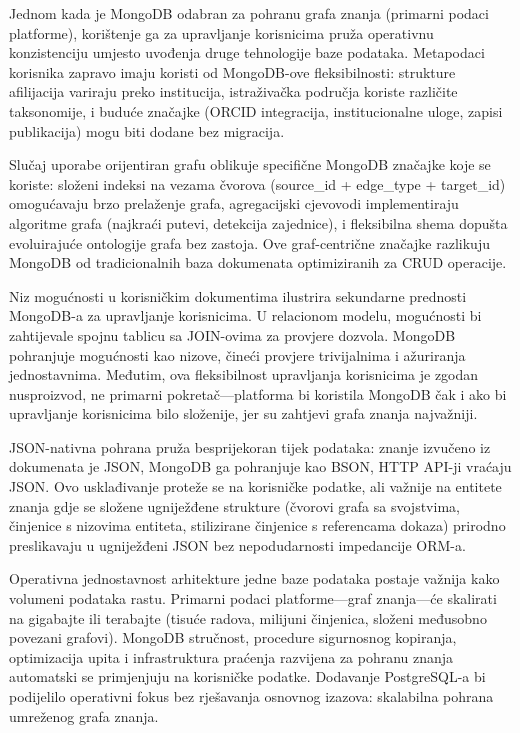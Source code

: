 \documentclass[12pt,a4paper]{article}
\begin{document}
Jednom kada je MongoDB odabran za pohranu grafa znanja (primarni podaci platforme), korištenje ga za upravljanje korisnicima pruža operativnu konzistenciju umjesto uvođenja druge tehnologije baze podataka. Metapodaci korisnika zapravo imaju koristi od MongoDB-ove fleksibilnosti: strukture afilijacija variraju preko institucija, istraživačka područja koriste različite taksonomije, i buduće značajke (ORCID integracija, institucionalne uloge, zapisi publikacija) mogu biti dodane bez migracija.

Slučaj uporabe orijentiran grafu oblikuje specifične MongoDB značajke koje se koriste: složeni indeksi na vezama čvorova (source\_id + edge\_type + target\_id) omogućavaju brzo prelaženje grafa, agregacijski cjevovodi implementiraju algoritme grafa (najkraći putevi, detekcija zajednice), i fleksibilna shema dopušta evoluirajuće ontologije grafa bez zastoja. Ove graf-centrične značajke razlikuju MongoDB od tradicionalnih baza dokumenata optimiziranih za CRUD operacije.

Niz mogućnosti u korisničkim dokumentima ilustrira sekundarne prednosti MongoDB-a za upravljanje korisnicima. U relacionom modelu, mogućnosti bi zahtijevale spojnu tablicu sa JOIN-ovima za provjere dozvola. MongoDB pohranjuje mogućnosti kao nizove, čineći provjere trivijalnima i ažuriranja jednostavnima. Međutim, ova fleksibilnost upravljanja korisnicima je zgodan nusproizvod, ne primarni pokretač—platforma bi koristila MongoDB čak i ako bi upravljanje korisnicima bilo složenije, jer su zahtjevi grafa znanja najvažniji.

JSON-nativna pohrana pruža besprijekoran tijek podataka: znanje izvučeno iz dokumenata je JSON, MongoDB ga pohranjuje kao BSON, HTTP API-ji vraćaju JSON. Ovo usklađivanje proteže se na korisničke podatke, ali važnije na entitete znanja gdje se složene ugniježđene strukture (čvorovi grafa sa svojstvima, činjenice s nizovima entiteta, stilizirane činjenice s referencama dokaza) prirodno preslikavaju u ugniježđeni JSON bez nepodudarnosti impedancije ORM-a.

Operativna jednostavnost arhitekture jedne baze podataka postaje važnija kako volumeni podataka rastu. Primarni podaci platforme—graf znanja—će skalirati na gigabajte ili terabajte (tisuće radova, milijuni činjenica, složeni međusobno povezani grafovi). MongoDB stručnost, procedure sigurnosnog kopiranja, optimizacija upita i infrastruktura praćenja razvijena za pohranu znanja automatski se primjenjuju na korisničke podatke. Dodavanje PostgreSQL-a bi podijelilo operativni fokus bez rješavanja osnovnog izazova: skalabilna pohrana umreženog grafa znanja.
\end{document}

